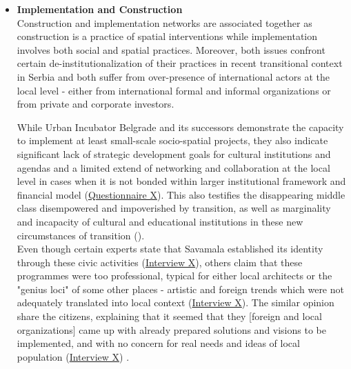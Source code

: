 \documentclass[11pt]{report}
\begin{document}
\begin{itemize}
\item \textbf{Implementation and Construction}
\\
Construction and implementation networks are associated together as construction is a practice of spatial interventions while implementation involves both social and spatial practices.
Moreover, both issues confront certain de-institutionalization of their practices in recent transitional context in Serbia and both suffer from over-presence of international actors at the local level - either from international formal and informal organizations or from private and corporate investors.

While Urban Incubator Belgrade and its successors demonstrate the capacity to implement at least small-scale socio-spatial projects, they also indicate significant lack of strategic development goals for cultural institutions and agendas and a limited extend of networking and collaboration at the local level in cases when it is not bonded within larger institutional framework and financial model (\href{Questionnaire Experts post-socialist}{Questionnaire X}).
This also testifies the disappearing middle class disempowered and impoverished by transition, as well as marginality and incapacity of cultural and educational institutions in these new circumstances of transition (\href{ref}{\citealt{doytchinov_belgrade_2015}}).
\\
Even though certain experts state that Savamala established its identity through these civic activities (\href{InterviewX}{Interview X}),
others claim that these programmes were too professional, typical for either local architects or the "genius loci" of some other places - artistic and foreign trends which were not adequately translated into local context (\href{InterviewX}{Interview X}).
The similar opinion share the citizens, explaining that it seemed that they [foreign and local organizations] came up with already prepared solutions and visions to be implemented, and with no concern for real needs and ideas of local population (\href{InterviewX}{Interview X})
.


\end{itemize}
\end{document}
